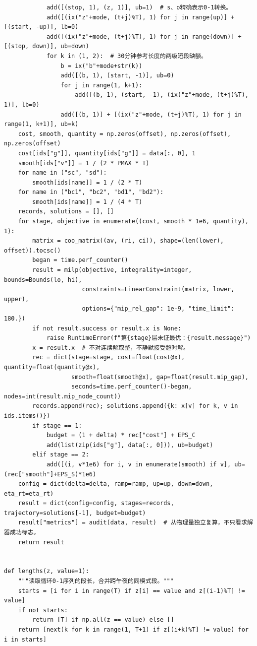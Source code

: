 \documentclass[withoutpreface,bwprint]{cumcmthesis}
\begin{document}
\begin{appendices}
\begin{lstlisting}
            add([(stop, 1), (z, 1)], ub=1)  # s、o精确表示0-1转换。
            add([(ix("z"+mode, (t+j)%T), 1) for j in range(up)] + [(start, -up)], lb=0)
            add([(ix("z"+mode, (t+j)%T), 1) for j in range(down)] + [(stop, down)], ub=down)
            for k in (1, 2):  # 30分钟参考长度的两级短段缺额。
                b = ix("b"+mode+str(k))
                add([(b, 1), (start, -1)], ub=0)
                for j in range(1, k+1):
                    add([(b, 1), (start, -1), (ix("z"+mode, (t+j)%T), 1)], lb=0)
                add([(b, 1)] + [(ix("z"+mode, (t+j)%T), 1) for j in range(1, k+1)], ub=k)
    cost, smooth, quantity = np.zeros(offset), np.zeros(offset), np.zeros(offset)
    cost[ids["g"]], quantity[ids["g"]] = data[:, 0], 1
    smooth[ids["v"]] = 1 / (2 * PMAX * T)
    for name in ("sc", "sd"):
        smooth[ids[name]] = 1 / (2 * T)
    for name in ("bc1", "bc2", "bd1", "bd2"):
        smooth[ids[name]] = 1 / (4 * T)
    records, solutions = [], []
    for stage, objective in enumerate((cost, smooth * 1e6, quantity), 1):
        matrix = coo_matrix((av, (ri, ci)), shape=(len(lower), offset)).tocsc()
        began = time.perf_counter()
        result = milp(objective, integrality=integer, bounds=Bounds(lo, hi),
                      constraints=LinearConstraint(matrix, lower, upper),
                      options={"mip_rel_gap": 1e-9, "time_limit": 180.})
        if not result.success or result.x is None:
            raise RuntimeError(f"第{stage}层未证最优：{result.message}")
        x = result.x  # 不对连续解取整，不静默接受超时解。
        rec = dict(stage=stage, cost=float(cost@x), quantity=float(quantity@x),
                   smooth=float(smooth@x), gap=float(result.mip_gap),
                   seconds=time.perf_counter()-began, nodes=int(result.mip_node_count))
        records.append(rec); solutions.append({k: x[v] for k, v in ids.items()})
        if stage == 1:
            budget = (1 + delta) * rec["cost"] + EPS_C
            add(list(zip(ids["g"], data[:, 0])), ub=budget)
        elif stage == 2:
            add([(i, v*1e6) for i, v in enumerate(smooth) if v], ub=(rec["smooth"]+EPS_S)*1e6)
    config = dict(delta=delta, ramp=ramp, up=up, down=down, eta_rt=eta_rt)
    result = dict(config=config, stages=records, trajectory=solutions[-1], budget=budget)
    result["metrics"] = audit(data, result)  # 从物理量独立复算，不只看求解器成功标志。
    return result


def lengths(z, value=1):
    """读取循环0-1序列的段长，合并跨午夜的同模式段。"""
    starts = [i for i in range(T) if z[i] == value and z[(i-1)%T] != value]
    if not starts:
        return [T] if np.all(z == value) else []
    return [next(k for k in range(1, T+1) if z[(i+k)%T] != value) for i in starts]



\end{lstlisting}
\end{appendices}
\end{document}
